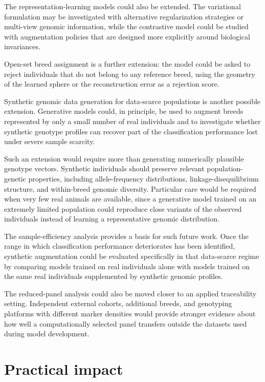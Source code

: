 The representation-learning models could also be extended. The
variational formulation may be investigated with alternative
regularization strategies or multi-view genomic information, while
the contrastive model could be studied with augmentation policies that
are designed more explicitly around biological invariances.

Open-set breed assignment is a further extension: the model could be
asked to reject individuals that do not belong to any reference breed,
using the geometry of the learned sphere or the reconstruction error
as a rejection score.

Synthetic genomic data generation for data-scarce populations is
another possible extension. Generative models could, in principle, be used
to augment breeds represented by only a small number of real
individuals and to investigate whether synthetic genotype profiles can
recover part of the classification performance lost under severe
sample scarcity.

Such an extension would require more than generating numerically
plausible genotype vectors. Synthetic individuals should preserve
relevant population-genetic properties, including allele-frequency
distributions, linkage-disequilibrium structure, and within-breed
genomic diversity. Particular care would be required when very few
real animals are available, since a generative model trained on an
extremely limited population could reproduce close variants of the
observed individuals instead of learning a representative genomic
distribution.

The sample-efficiency analysis provides a basis for such future work. Once the range in which
classification performance deteriorates has been identified, synthetic
augmentation could be evaluated specifically in that data-scarce
regime by comparing models trained on real individuals alone with
models trained on the same real individuals supplemented by synthetic
genomic profiles.

The reduced-panel analysis could also be moved closer to an
applied traceability setting. Independent external cohorts, additional
breeds, and genotyping platforms with different marker densities would
provide stronger evidence about how well a computationally selected
panel transfers outside the datasets used during model development.

\section*{Practical impact}

